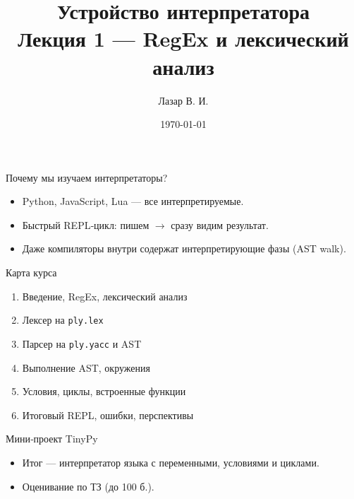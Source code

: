 \documentclass[aspectratio=169]{beamer}
\title[Лекция 1]{Устройство интерпретатора\\ \small Лекция 1 — RegEx и лексический анализ}
\author{Лазар В. И.}
\date{\today}
\begin{document}
\begin{frame}
	\titlepage
\end{frame}
\begin{frame}{Почему мы изучаем интерпретаторы?}
	\begin{itemize}
		\item Python, JavaScript, Lua — все интерпретируемые.
		\item Быстрый REPL‑цикл: пишем $\rightarrow$ сразу видим результат.
		\item Даже компиляторы внутри содержат интерпретирующие фазы (AST walk).
	\end{itemize}
	\pause
\end{frame}

\begin{frame}{Карта курса}
	\begin{enumerate}
		\item Введение, RegEx, лексический анализ
		\item Лексер на \texttt{ply.lex}
		\item Парсер на \texttt{ply.yacc} и AST
		\item Выполнение AST, окружения
		\item Условия, циклы, встроенные функции
		\item Итоговый REPL, ошибки, перспективы
	\end{enumerate}
\end{frame}

\begin{frame}{Мини‑проект TinyPy}
	\begin{itemize}
		\item Итог — интерпретатор языка с переменными, условиями и циклами.
		\item Оценивание по ТЗ (до 100 б.).
	\end{itemize}
\end{frame}
\end{document}
